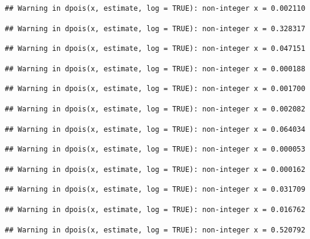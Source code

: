 \documentclass[]{article}
\begin{document}
\begin{verbatim}
## Warning in dpois(x, estimate, log = TRUE): non-integer x = 0.002110
\end{verbatim}

\begin{verbatim}
## Warning in dpois(x, estimate, log = TRUE): non-integer x = 0.328317
\end{verbatim}

\begin{verbatim}
## Warning in dpois(x, estimate, log = TRUE): non-integer x = 0.047151
\end{verbatim}

\begin{verbatim}
## Warning in dpois(x, estimate, log = TRUE): non-integer x = 0.000188
\end{verbatim}

\begin{verbatim}
## Warning in dpois(x, estimate, log = TRUE): non-integer x = 0.001700
\end{verbatim}

\begin{verbatim}
## Warning in dpois(x, estimate, log = TRUE): non-integer x = 0.002082
\end{verbatim}

\begin{verbatim}
## Warning in dpois(x, estimate, log = TRUE): non-integer x = 0.064034
\end{verbatim}

\begin{verbatim}
## Warning in dpois(x, estimate, log = TRUE): non-integer x = 0.000053
\end{verbatim}

\begin{verbatim}
## Warning in dpois(x, estimate, log = TRUE): non-integer x = 0.000162
\end{verbatim}

\begin{verbatim}
## Warning in dpois(x, estimate, log = TRUE): non-integer x = 0.031709
\end{verbatim}

\begin{verbatim}
## Warning in dpois(x, estimate, log = TRUE): non-integer x = 0.016762
\end{verbatim}

\begin{verbatim}
## Warning in dpois(x, estimate, log = TRUE): non-integer x = 0.520792
\end{verbatim}
\end{document}
